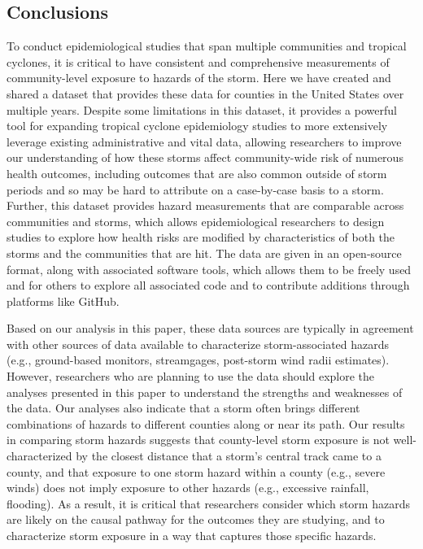 \subsection*{Conclusions}

To conduct epidemiological studies that span multiple communities and tropical 
cyclones, it is critical to have consistent and comprehensive measurements of 
community-level exposure to hazards of the storm. Here we have created and 
shared a dataset that provides these data for counties in the United States
over multiple years. Despite some limitations in this dataset, it provides 
a powerful tool for expanding tropical cyclone epidemiology studies to more
extensively leverage existing administrative and vital data, allowing researchers
to improve our understanding of how these storms affect community-wide risk of 
numerous health outcomes, including outcomes that are also common outside of storm 
periods and so may be hard to attribute on a case-by-case basis to a storm. 
Further, this dataset provides hazard measurements that are comparable across
communities and storms, which allows epidemiological researchers to design studies
to explore how health risks are modified by characteristics of both the storms and
the communities that are hit. The data are given in an open-source format, along 
with associated software tools, which allows them to be freely used and for others
to explore all associated code and to contribute additions through platforms like 
GitHub.

Based on our analysis in this paper, these data sources are typically in agreement
with other sources of data available to characterize storm-associated hazards
(e.g., ground-based monitors, streamgages, post-storm wind radii estimates). 
However, researchers who are planning to use the data should explore the analyses
presented in this paper to understand the strengths and weaknesses of the data. 
Our analyses also indicate that a storm often brings different combinations of 
hazards to different counties along or near its path. Our results in comparing 
storm hazards suggests that county-level storm exposure is not well-characterized 
by the closest distance that a storm's central track came to a county, and that
exposure to one storm hazard within a county (e.g., severe winds) does not imply 
exposure to other hazards (e.g., excessive rainfall, flooding). As a result, it is 
critical that researchers consider which storm hazards are likely on the causal 
pathway for the outcomes they are studying, and to characterize storm exposure
in a way that captures those specific hazards. 

